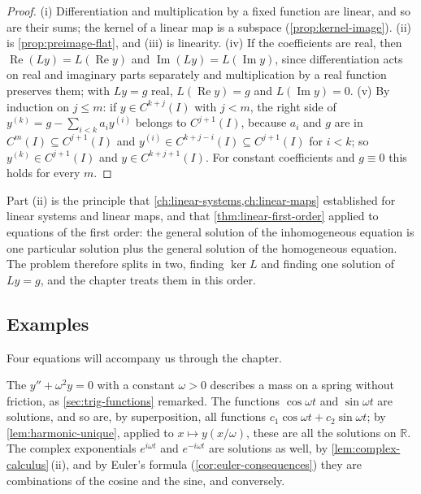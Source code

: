 \begin{proof}
(i) Differentiation and multiplication by a fixed function are linear, and so are their sums; the kernel of a linear map is a subspace (\cref{prop:kernel-image}). (ii) is \cref{prop:preimage-flat}, and (iii) is linearity. (iv) If the coefficients are real, then $\operatorname{Re}(Ly)=L(\operatorname{Re}y)$ and $\operatorname{Im}(Ly)=L(\operatorname{Im}y)$, since differentiation acts on real and imaginary parts separately and multiplication by a real function preserves them; with $Ly=g$ real, $L(\operatorname{Re}y)=g$ and $L(\operatorname{Im}y)=0$. (v) By induction on $j\le m$: if $y\in C^{k+j}(I)$ with $j<m$, the right side of $y^{(k)}=g-\sum_{i<k}a_iy^{(i)}$ belongs to $C^{j+1}(I)$, because $a_i$ and $g$ are in $C^m(I)\subseteq C^{j+1}(I)$ and $y^{(i)}\in C^{k+j-i}(I)\subseteq C^{j+1}(I)$ for $i<k$; so $y^{(k)}\in C^{j+1}(I)$ and $y\in C^{k+j+1}(I)$. For constant coefficients and $g\equiv0$ this holds for every $m$.
\end{proof}

Part (ii) is the principle that \cref{ch:linear-systems,ch:linear-maps} established for linear systems and linear maps, and that \cref{thm:linear-first-order} applied to equations of the first order: the general solution of the inhomogeneous equation is one particular solution plus the general solution of the homogeneous equation. The problem therefore splits in two, finding $\ker L$ and finding one solution of $Ly=g$, and the chapter treats them in this order.

\subsection{Examples}

Four equations will accompany us through the chapter.

The  $y''+\omega^2y=0$ with a constant $\omega>0$ describes a mass on a spring without friction, as \cref{sec:trig-functions} remarked. The functions $\cos\omega t$ and $\sin\omega t$ are solutions, and so are, by superposition, all functions $c_1\cos\omega t+c_2\sin\omega t$; by \cref{lem:harmonic-unique}, applied to $x\mapsto y(x/\omega)$, these are all the solutions on $\mathbb R$. The complex exponentials $e^{i\omega t}$ and $e^{-i\omega t}$ are solutions as well, by \cref{lem:complex-calculus}\,(ii), and by Euler's formula (\cref{cor:euler-consequences}) they are combinations of the cosine and the sine, and conversely.

